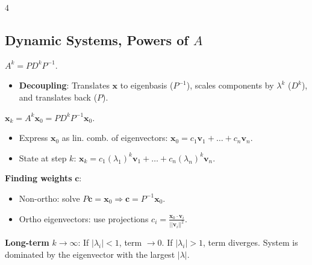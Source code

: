 \documentclass[9pt]{extarticle}
\begin{document}
\begin{multicols*}{4}
\subsection*{Dynamic Systems, Powers of $A$}
$A^{k}=PD^{k}P^{-1}$.
\begin{itemize}
    \item \textbf{Decoupling}: Translates $\mathbf{x}$ to eigenbasis ($P^{-1}$), scales components by $\lambda^k$ ($D^{k}$), and translates back ($P$).
\end{itemize}
$\mathbf{x}_{k}=A^{k}\mathbf{x}_{0}=PD^{k}P^{-1}\mathbf{x}_{0}$.
\begin{itemize}
    \item Express $\mathbf{x}_{0}$ as lin. comb. of eigenvectors: $\mathbf{x}_{0}=c_{1}\mathbf{v}_{1}+\dots+c_{n}\mathbf{v}_{n}$.
    \item State at step $k$: $\mathbf{x}_{k}=c_{1}(\lambda_{1})^{k}\mathbf{v}_{1}+\dots+c_{n}(\lambda_{n})^{k}\mathbf{v}_{n}$.
\end{itemize}
\textbf{Finding weights} $\mathbf{c}$:
\begin{itemize}
    \item Non-ortho: solve $P\mathbf{c}=\mathbf{x}_{0} \Rightarrow \mathbf{c} = P^{-1}\mathbf{x}_0$.
    \item Ortho eigenvectors: use projections $c_{i}=\frac{\mathbf{x}_{0}\cdot \mathbf{v}_{i}}{||\mathbf{v}_i||^2}$.
\end{itemize}
\textbf{Long-term} $k \to \infty$: If $|\lambda_{i}|<1$, term $\to 0$. If $|\lambda_i| > 1$, term diverges. System is dominated by the eigenvector with the largest $|\lambda|$.


\end{multicols*}
\end{document}

